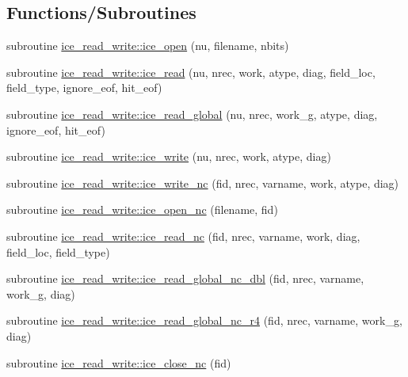 \subsection*{Functions/Subroutines}
\begin{DoxyCompactItemize}
\item 
subroutine \hyperlink{namespaceice__read__write_ad696392c65cb5608c5d752fd21772c6c}{ice\_\-read\_\-write::ice\_\-open} (nu, filename, nbits)
\item 
subroutine \hyperlink{namespaceice__read__write_a0a5831674445b8a414a0b73b554ad166}{ice\_\-read\_\-write::ice\_\-read} (nu, nrec, work, atype, diag, field\_\-loc, field\_\-type, ignore\_\-eof, hit\_\-eof)
\item 
subroutine \hyperlink{namespaceice__read__write_a25d913eb64dad37cf58e9c095ad4627a}{ice\_\-read\_\-write::ice\_\-read\_\-global} (nu, nrec, work\_\-g, atype, diag, ignore\_\-eof, hit\_\-eof)
\item 
subroutine \hyperlink{namespaceice__read__write_a6fd5225cadcb9e4b36318dc93d4d8201}{ice\_\-read\_\-write::ice\_\-write} (nu, nrec, work, atype, diag)
\item 
subroutine \hyperlink{namespaceice__read__write_a371e7c35fea2456c221e0451f87bb2eb}{ice\_\-read\_\-write::ice\_\-write\_\-nc} (fid, nrec, varname, work, atype, diag)
\item 
subroutine \hyperlink{namespaceice__read__write_ab2f5aad237f6bdcee1e5e90537050822}{ice\_\-read\_\-write::ice\_\-open\_\-nc} (filename, fid)
\item 
subroutine \hyperlink{namespaceice__read__write_a412c3f66b66a3ff61e7b5c3fb3205889}{ice\_\-read\_\-write::ice\_\-read\_\-nc} (fid, nrec, varname, work, diag, field\_\-loc, field\_\-type)
\item 
subroutine \hyperlink{namespaceice__read__write_a7e7f4faac57a154facfd07a272b2cb76}{ice\_\-read\_\-write::ice\_\-read\_\-global\_\-nc\_\-dbl} (fid, nrec, varname, work\_\-g, diag)
\item 
subroutine \hyperlink{namespaceice__read__write_a3fda8cf973518b47282724d7464eddc5}{ice\_\-read\_\-write::ice\_\-read\_\-global\_\-nc\_\-r4} (fid, nrec, varname, work\_\-g, diag)
\item 
subroutine \hyperlink{namespaceice__read__write_ae296957254d38ce1229d08bd1ded45a6}{ice\_\-read\_\-write::ice\_\-close\_\-nc} (fid)
\end{DoxyCompactItemize}
